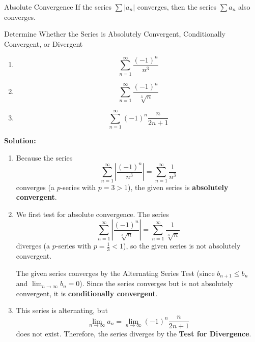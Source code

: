 \documentclass[12pt]{article}
\theoremstyle{beautifulthm}
\begin{document}
\begin{mytheorem}{Absolute Convergence}{}   
If the series $\sum |a_n|$ converges, then the series $\sum a_n$ also converges.

\end{mytheorem}

\begin{tcolorbox}[colback=examplebg, colframe=red!75!black, title=\textbf{EXAMPLE 1: Absolute or Conditional Convergence}, fonttitle=\bfseries, sharp corners]
 Determine Whether the Series is Absolutely Convergent, Conditionally Convergent, or Divergent
\begin{enumerate}
    \item[(a)] \[
    \sum_{n=1}^\infty \frac{(-1)^n}{n^3}
    \]
    \item[(b)] \[
    \sum_{n=1}^\infty \frac{(-1)^n}{\sqrt[3]{n}}
    \]
    \item[(c)] \[
    \sum_{n=1}^\infty (-1)^n \frac{n}{2n + 1}
    \]
\end{enumerate}

\tcblower
\textbf{Solution:} 
\begin{enumerate}
    \item[(a)] Because the series
    \[
    \sum_{n=1}^\infty \left| \frac{(-1)^n}{n^3} \right| = \sum_{n=1}^\infty \frac{1}{n^3}
    \]
    converges (a $p$-series with $p = 3 > 1$), the given series is \textbf{absolutely convergent}.

    \item[(b)] We first test for absolute convergence. The series
    \[
    \sum_{n=1}^\infty \left| \frac{(-1)^n}{\sqrt[3]{n}} \right| = \sum_{n=1}^\infty \frac{1}{\sqrt[3]{n}}
    \]
    diverges (a $p$-series with $p = \frac{1}{3} < 1$), so the given series is not absolutely convergent.

    The given series converges by the Alternating Series Test (since $b_{n+1} \leq b_n$ and $\lim_{n \to \infty} b_n = 0$). Since the series converges but is not absolutely convergent, it is \textbf{conditionally convergent}.

    \item[(c)] This series is alternating, but
    \[
    \lim_{n \to \infty} a_n = \lim_{n \to \infty} (-1)^n \frac{n}{2n + 1}
    \]
    does not exist. Therefore, the series diverges by the \textbf{Test for Divergence}.
\end{enumerate}
\end{tcolorbox}
\end{document}
